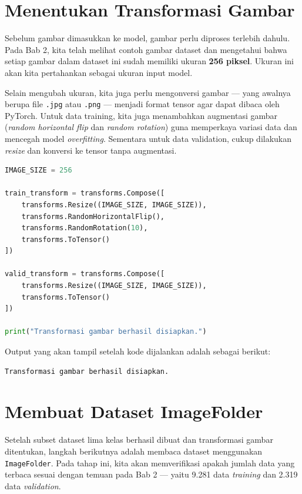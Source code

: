 \section{Menentukan Transformasi Gambar}

Sebelum gambar dimasukkan ke model, gambar perlu diproses terlebih dahulu. Pada Bab 2, kita telah melihat contoh gambar dataset dan mengetahui bahwa setiap gambar dalam dataset ini sudah memiliki ukuran \textbf{256 piksel}. Ukuran ini akan kita pertahankan sebagai ukuran input model.

Selain mengubah ukuran, kita juga perlu mengonversi gambar --- yang awalnya berupa file \texttt{.jpg} atau \texttt{.png} --- menjadi format tensor agar dapat dibaca oleh PyTorch. Untuk data training, kita juga menambahkan augmentasi gambar (\textit{random horizontal flip} dan \textit{random rotation}) guna memperkaya variasi data dan mencegah model \textit{overfitting}. Sementara untuk data validation, cukup dilakukan \textit{resize} dan konversi ke tensor tanpa augmentasi.

\begin{lstlisting}[language=Python, caption=Menentukan transformasi gambar]
IMAGE_SIZE = 256

train_transform = transforms.Compose([
    transforms.Resize((IMAGE_SIZE, IMAGE_SIZE)),
    transforms.RandomHorizontalFlip(),
    transforms.RandomRotation(10),
    transforms.ToTensor()
])

valid_transform = transforms.Compose([
    transforms.Resize((IMAGE_SIZE, IMAGE_SIZE)),
    transforms.ToTensor()
])

print("Transformasi gambar berhasil disiapkan.")
\end{lstlisting}

Output yang akan tampil setelah kode dijalankan adalah sebagai berikut:

\begin{outputcode}[H]
\begin{lstlisting}[language={}]
Transformasi gambar berhasil disiapkan.
\end{lstlisting}
\caption{Output transformasi gambar}
\end{outputcode}

\section{Membuat Dataset ImageFolder}

Setelah subset dataset lima kelas berhasil dibuat dan transformasi gambar ditentukan, langkah berikutnya adalah membaca dataset menggunakan \texttt{ImageFolder}. Pada tahap ini, kita akan memverifikasi apakah jumlah data yang terbaca sesuai dengan temuan pada Bab 2 --- yaitu 9.281 data \textit{training} dan 2.319 data \textit{validation}.

